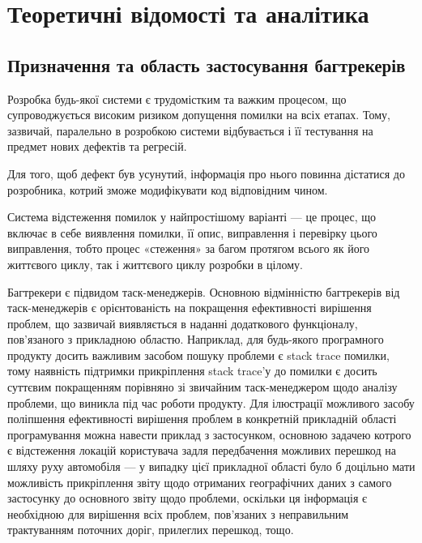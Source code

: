 \documentclass[../main.tex]{subfiles}
\begin{document}
\chapter{Теоретичні відомості та аналітика}

\section{Призначення та область застосування багтрекерів}

Розробка будь-якої системи є трудомістким та важким процесом, що супроводжується високим ризиком допущення помилки на всіх етапах. Тому, зазвичай, паралельно в розробкою системи відбувається і її тестування на предмет нових дефектів та регресій.

Для того, щоб дефект був усунутий, інформація про нього повинна дістатися до розробника, котрий зможе модифікувати код відповідним чином.

Система відстеження помилок у найпростішому варіанті — це процес, що включає в себе виявлення помилки, її опис, виправлення і перевірку цього виправлення, тобто процес «стеження» за багом протягом всього як його життєвого циклу, так і життєвого циклу розробки в цілому.\cite{bugtracking_systems}

Багтрекери є підвидом таск-менеджерів. Основною відмінністю багтрекерів від таск-менеджерів є  орієнтованість на покращення ефективності вирішення проблем, що зазвичай виявляється в наданні додаткового функціоналу, пов'язаного з прикладною областю. Наприклад, для будь-якого програмного продукту досить важливим засобом пошуку проблеми є stack trace помилки, тому наявність підтримки прикріплення stack trace'у до помилки є досить суттєвим покращенням порівняно зі звичайним таск-менеджером щодо аналізу проблеми, що виникла під час роботи продукту. Для ілюстрації можливого засобу поліпшення ефективності вирішення проблем в конкретній прикладній області програмування можна навести приклад з застосунком, основною задачею котрого є відстеження локацій користувача задля передбачення можливих перешкод на шляху руху автомобіля — у випадку цієї прикладної області було б доцільно мати можливість прикріплення звіту щодо отриманих географічних даних з самого застосунку до основного звіту щодо проблеми, оскільки ця інформація є необхідною для вирішення всіх проблем, пов'язаних з неправильним трактуванням поточних доріг, прилеглих перешкод, тощо.
\end{document}
